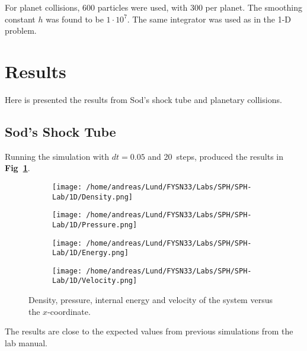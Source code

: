 \documentclass[12pt]{article}
\begin{document}
For planet collisions, 600 particles were used, with 300 per planet. The smoothing constant $ h $ was found to be $ 1 \cdot 10^7 $. The same integrator was used as in the 1-D problem.

\section{Results}

Here is presented the results from Sod's shock tube and planetary collisions.

\subsection{Sod's Shock Tube}

Running the simulation with $ dt = 0.05 $ and 20~steps, produced the results in \textbf{Fig~\ref{fig:1d}}.

\begin{figure}[H]
	\centering
	
	\begin{subfigure}[c]{0.45\textwidth}
		\centering
		\texttt{[image: /home/andreas/Lund/FYSN33/Labs/SPH/SPH-Lab/1D/Density.png]}
	\end{subfigure}
	\hfill
	\begin{subfigure}[c]{0.45\textwidth}
		\centering
		\texttt{[image: /home/andreas/Lund/FYSN33/Labs/SPH/SPH-Lab/1D/Pressure.png]}
	\end{subfigure}
	
	\vskip 0.1cm %
	
	\begin{subfigure}[c]{0.45\textwidth}
		\centering
		\texttt{[image: /home/andreas/Lund/FYSN33/Labs/SPH/SPH-Lab/1D/Energy.png]}
	\end{subfigure}
	\hfill
	\begin{subfigure}[c]{0.45\textwidth}
		\centering
		\texttt{[image: /home/andreas/Lund/FYSN33/Labs/SPH/SPH-Lab/1D/Velocity.png]}
	\end{subfigure}
	
	\caption{Density, pressure, internal energy and velocity of the system versus the $ x $-coordinate.}
	\label{fig:1d}
\end{figure}

The results are close to the expected values from previous simulations from the lab manual\cite{Hobbs}. 
\end{document}
